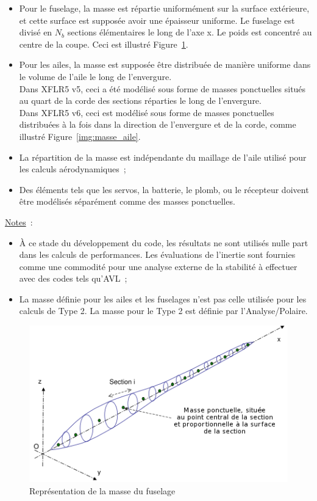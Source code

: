 \documentclass[a4paper,twoside,12pt,dvips]{article}
\begin{document}
\begin{itemize}
	\item Pour le fuselage, la masse est répartie uniformément sur la surface  
	extérieure, et cette surface est supposée avoir une épaisseur uniforme. Le 
	fuselage est divisé en $N_b$ sections élémentaires le long de l’axe x. Le 
	poids est concentré au centre de la coupe. Ceci est illustré 
	Figure~\ref{img:masse_fuselage}.
	\item Pour les ailes, la masse est supposée être distribuée de manière 
	uniforme dans le volume de l’aile le long de l’envergure.\\
	Dans XFLR5 v5, ceci a été modélisé sous forme de masses ponctuelles situés 
	au quart de la corde des sections réparties le long de l’envergure.\\
	Dans XFLR5 v6, ceci est modélisé sous forme de masses ponctuelles 
	distribuées à la fois dans la direction de l’envergure et de la corde, comme 
	illustré Figure~\ref{img:masse_aile}.
	\item La répartition de la masse est indépendante du maillage de l’aile 
	utilisé pour les calculs aérodynamiques~;
	\item Des éléments tels que les servos, la batterie, le plomb, ou le 
	récepteur doivent être modélisés séparément comme des masses ponctuelles.
\end{itemize}

\underline{Notes}~:
  \begin{itemize}
	\item À ce stade du développement du code, les résultats ne sont utilisés 
	nulle part dans les calculs de performances. Les évaluations de l’inertie 
	sont fournies comme une commodité pour une analyse externe de la stabilité à 
	effectuer avec des codes tels qu’AVL~;
	\item La masse définie pour les ailes et les fuselages n’est pas celle 
	utilisée pour les calculs de Type 2. La masse pour le Type 2 est définie par 
	l’Analyse/Polaire.
  \end{itemize}

\begin{figure}[htbp]
	\centering
	\includegraphics[width=0.8\linewidth]{img-09-fr}
	\caption{Représentation de la masse du fuselage}
	\label{img:masse_fuselage}
\end{figure}
\end{document}
